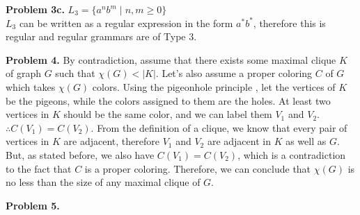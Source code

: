\documentclass{article}
\begin{document}
\textbf{Problem 3c.} $L_3 = \{ a^nb^m \mid n,m \geq 0 \}$ \\
$L_3$ can be written as a regular expression in the form $a^*b^*$, therefore this is regular and regular grammars are of Type 3.

\hfill

\textbf{Problem 4.} By contradiction, assume that there exists some maximal clique $K$ of graph $G$ such that $\chi(G) < |K|$. Let's also assume a proper coloring \cite{website:4} $C$ of $G$ which takes $\chi(G)$ colors. Using the pigeonhole principle \cite{website:3}, let the vertices of $K$ be the pigeons, while the colors assigned to them are the holes. At least two vertices in $K$ should be the same color, and we can label them $V_1$ and $V_2$. $\therefore C(V_1) = C(V_2)$. From the definition of a clique, we know that every pair of vertices in $K$ are adjacent, therefore $V_1$ and $V_2$ are adjacent in $K$ as well as $G$. But, as stated before, we also have $C(V_1) = C(V_2)$, which is a contradiction to the fact that $C$ is a proper coloring. Therefore, we can conclude that $\chi(G)$ is no less than the size of any maximal clique of $G$.

\hfill

\textbf{Problem 5.} 

\newpage
 

\end{document}
